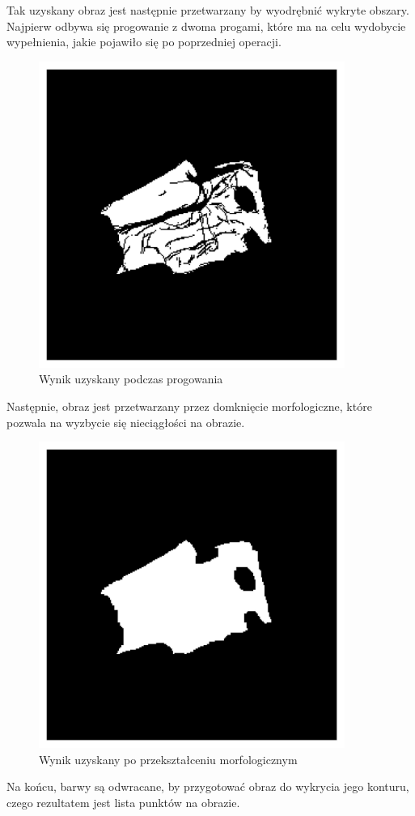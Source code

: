 Tak uzyskany obraz jest następnie przetwarzany by wyodrębnić wykryte obszary. Najpierw odbywa się progowanie z dwoma progami, które ma na celu wydobycie wypełnienia, jakie pojawiło się po poprzedniej operacji. 

\begin{figure}[H]
    \centering
    \includegraphics[width=10cm]{images/Thresholding.jpg}
    \caption{Wynik uzyskany podczas progowania}
\end{figure}

Następnie, obraz jest przetwarzany przez domknięcie morfologiczne, które pozwala na wyzbycie się nieciągłości na obrazie. 

\begin{figure}[H]
    \centering
    \includegraphics[width=10cm]{images/Morphology.jpg}
    \caption{Wynik uzyskany po przekształceniu morfologicznym}
\end{figure}
\newpage
Na końcu, barwy są odwracane, by przygotować obraz do wykrycia jego konturu, czego rezultatem jest lista punktów na obrazie. 

